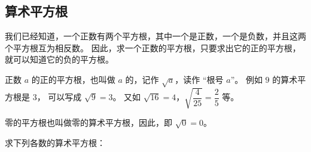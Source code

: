 \subsection{算术平方根}\label{subsec:9-2}
\begin{enhancedline}

我们已经知道，一个正数有两个平方根，其中一个是正数，一个是负数，并且这两个平方根互为相反数。
因此，求一个正数的平方根，只要求出它的正的平方根，就可以知道它的负的平方根。

正数 $a$ 的正的平方根，也叫做 $a$ 的，记作 $\sqrt{a}$，读作 “根号 $a$”。
例如 $9$ 的算术平方根是 $3$， 可以写成 $\sqrt{9} = 3$。
又如 $\sqrt{16} = 4$，$\sqrt{\dfrac{4}{25}} = \dfrac{2}{5}$ 等。

零的平方根也叫做零的算术平方根，因此，即 $\sqrt{0} = 0$。

\liti 求下列各数的算术平方根：
\begin{xiaoxiaotis}

    \hspace*{1.5em} 

\resetxxt
\jie {}

\hspace*{1.5em} 

\hspace*{1.5em} 

\end{xiaoxiaotis}



\end{enhancedline}
